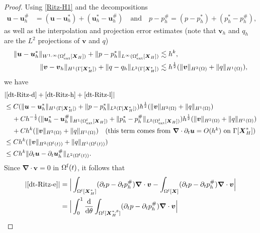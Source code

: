 \documentclass[11pt,reqno]{amsart}
\theoremstyle{definition}
\theoremstyle{plain}
\numberwithin{theorem}{section}
\numberwithin{proposition}{section}
\numberwithin{lemma}{section}
\numberwithin{equation}{section}
\newcommand{\bs}[1]{\boldsymbol{#1}}
\newcommand{\uu}[1]  {{\bs{#1}} }
\newcommand{\grad}   { \uu{\nabla}    }
\def\d{\mathrm{d}}
\renewcommand{\(}{\bigl(}
\renewcommand{\)}{\bigr)}
\begin{document}
\begin{proof}
Using \eqref{Ritz-H1} and the decompositions 
\begin{align*}
{\bs u}-{\bs u}_h^\# 
&= ({\bs u}-{\bs u}_h^*) + ({\bs u}_h^*-{\bs u}_h^\#) 
\quad\mbox{and}\quad 
p-p_h^\# = (p-p_h^*) + (p_h^*-p_h^\#) ,
\end{align*}
as well as the interpolation and projection error estimates 
(note that ${\bs v}_h$ and $q_h$ are the $L^2$ projections of ${\bs v}$ and $q$)
\begin{align*}
\|{\bs u}-{\bs u}_h^*\|_{W^{1,\infty}(\Omega^{\rm f}_{\rm ext}[{\bs X}_H])}
+ \|p-p_h^*\|_{L^{\infty}(\Omega^{\rm f}_{\rm ext}[{\bs X}_H])} &\lesssim h^k , \\
\|{\bs v}-{\bs v}_h\|_{H^1(\Gamma[{\bs X}_H^*])} +\|q-q_h\|_{L^2(\Gamma[{\bs X}_H^*])} 
&\lesssim h^{\frac12}(\|{\bs v}\|_{H^2(\Omega)}+\|q\|_{H^1(\Omega)}) , 
\end{align*}
we have 
\begin{align*}
&| \eqref{dt-Ritz-d} + \eqref{dt-Ritz-h} + \eqref{dt-Ritz-l} | \notag\\
&\le C(\|{\bs u}-{\bs u}_h^*\|_{H^1(\Gamma[{\bs X}_H^*])}+\|p-p_h^*\|_{L^2(\Gamma[{\bs X}_H^*])})h^{\frac12}(\|{\bs v}\|_{H^2(\Omega)}+\|q\|_{H^1(\Omega)})  \notag\\
&\quad\, 
+ Ch^{-\frac12} (\|{\bs u}_h^*-{\bs u}_h^\#\|_{H^1(\Omega^{\rm f}_{\rm ext}[{\bs X}_H])}+\|p_h^*-p_h^\#\|_{L^2(\Omega^{\rm f}_{\rm ext}[{\bs X}_H])})h^{\frac12}(\|{\bs v}\|_{H^2(\Omega)}+\|q\|_{H^1(\Omega)}) \notag\\
&\quad\, 
+ Ch^k(\|{\bs v}\|_{H^2(\Omega)}+\|q\|_{H^1(\Omega)}) \quad\mbox{(this term comes from $\grad\cdot \partial_t{\bs u} =O(h^k)$ on $\Gamma[\bs X_H^*]$)} \notag\\
&\le Ch^{k} (\|{\bs v}\|_{H^2(\Omega^{\rm f}(t))} +\|q\|_{H^1(\Omega^{\rm f}(t))} ) \notag\\
&\le Ch^{k} \|\partial_t{\bs u}-\partial_t{\bs u}_h^\#\|_{L^2(\Omega^{\rm f}(t))} .
\end{align*}
Since $\grad\cdot{\bs v}=0$ in $\Omega^{\rm f}(t)$, it follows that 
\begin{align*}
|\eqref{dt-Ritz-e}|
&=\Big|\int_{\Omega^{\rm f}[\bs X_H^*]} ( \partial_tp - \partial_tp_h^\# ) \grad\cdot{\bs v} - \int_{\Omega^{\rm f}[{\bs X}]} ( \partial_tp - \partial_tp_h^\# ) \grad\cdot{\bs v} \Big|\\
&= \Big|\int_0^1 \frac{\d}{\d\theta} \int_{\Omega^{\rm f}[\bs X_H^{*,\theta}]} ( \partial_tp - \partial_tp_h^\# ) \grad\cdot{\bs v}\Big| \\

\end{align*}
\end{proof}
\end{document}
